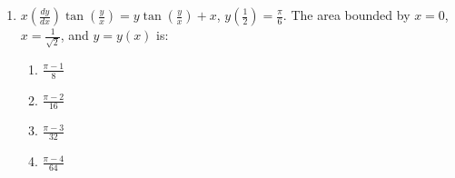 \documentclass[journal]{IEEEtran}
\newcommand{\brak}[1]{\left( #1 \right)}
\begin{document}
\begin{enumerate}
    
     \item $x \brak{\frac{dy}{dx}} \tan\brak{\frac{y}{x}} = y \tan\brak{\frac{y}{x}} + x$, $y\brak{\frac{1}{2}} = \frac{\pi}{6}$. The area bounded by $x = 0$, $x = \frac{1}{\sqrt{2}}$, and $y = y\brak{x}$ is:
    
        \begin{multicols}{4}
        \begin{enumerate}
        \item $\frac{\pi - 1}{8}$
        \item $\frac{\pi - 2}{16}$
        \item $\frac{\pi - 3}{32}$
        \item $\frac{\pi - 4}{64}$
        \end{enumerate}
        \end{multicols}

    \end{enumerate}
\end{document}

